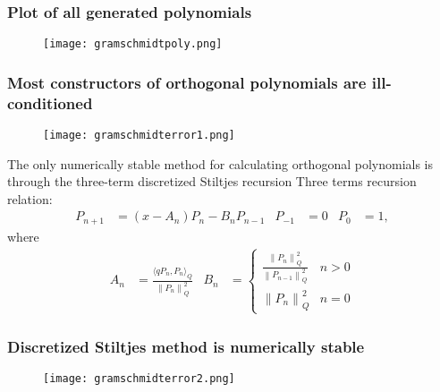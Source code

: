 \documentclass[handout]{beamer}
\newcommand{\norm}[1]{\left\lVert#1\right\rVert_{\!Q}}
\begin{document}
\begin{frame}
 \frametitle{Plot of all generated polynomials}
  \begin{figure}
    \texttt{[image: gramschmidtpoly.png]}
  \end{figure}
\end{frame}


\begin{frame}
 \frametitle{Most constructors of orthogonal polynomials are
 ill-conditioned}
     \begin{figure}
    \texttt{[image: gramschmidterror1.png]}
  \end{figure}

 \end{frame}


\begin{frame}
 {The only numerically stable method for
 calculating orthogonal polynomials is through the three-term discretized
 Stiltjes recursion}
 \pause
 Three terms recursion relation:
 \begin{align*}
     P_{n+1} &= (x-A_n) P_n - B_n P_{n-1} &
     P_{-1} &= 0 & P_0 &= 1,
 \end{align*}
    \pause
   where
   \begin{align*}
   A_n &= \frac{\langle qP_n,P_n\rangle_Q}{\norm{P_n}^2}
   &
  B_n &=
  \begin{cases}
  \frac{\norm{P_n}^2}{\norm{P_{n-1}}^2} & n > 0\\
  \norm{P_n}^2 & n = 0
  \end{cases}
   \end{align*}
  \end{frame}

\begin{frame}
 \frametitle{Discretized Stiltjes method is numerically stable}


    \begin{figure}
    \texttt{[image: gramschmidterror2.png]}
  \end{figure}
 \end{frame}
\end{document}
